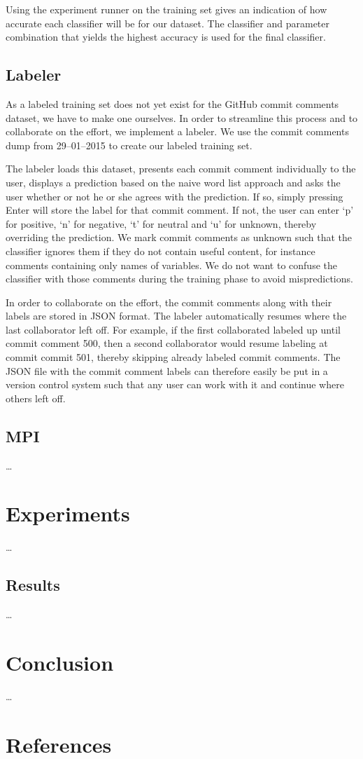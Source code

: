 \documentclass{article}
\begin{document}
Using the experiment runner on the training set gives an indication of
how accurate each classifier will be for our dataset. The classifier and
parameter combination that yields the highest accuracy is used for the
final classifier.

\subsection{Labeler}\label{sec:labeler}
As a labeled training set does not yet exist for the GitHub commit comments
dataset, we have to make one ourselves. In order to streamline this process
and to collaborate on the effort, we implement a labeler. We use the commit
comments dump from 29--01--2015 to create our labeled training set.

The labeler loads this dataset, presents each commit comment individually to
the user, displays a prediction based on the naive word list approach and asks
the user whether or not he or she agrees with the prediction. If so, simply
pressing Enter will store the label for that commit comment. If not, the user
can enter `p' for positive, `n' for negative, `t' for neutral and `u' for
unknown, thereby overriding the prediction. We mark commit comments as unknown
such that the classifier ignores them if they do not contain useful content,
for instance comments containing only names of variables. We do not want to
confuse the classifier with those comments during the training phase to avoid
mispredictions.

In order to collaborate on the effort, the commit comments along with their
labels are stored in JSON format. The labeler automatically resumes where
the last collaborator left off. For example, if the first collaborated labeled
up until commit comment 500, then a second collaborator would resume labeling
at commit commit 501, thereby skipping already labeled commit comments. The
JSON file with the commit comment labels can therefore easily be put in a
version control system such that any user can work with it and continue where
others left off.

\subsection{MPI}\label{sec:mpi}
\ldots

\section{Experiments}\label{sec:experiments}
\ldots

\subsection{Results}\label{sec:results}
\ldots

\section{Conclusion}\label{sec:conclusion}
\ldots

\section{References}\label{sec:references}
\printbibliography[heading=none]
\end{document}
